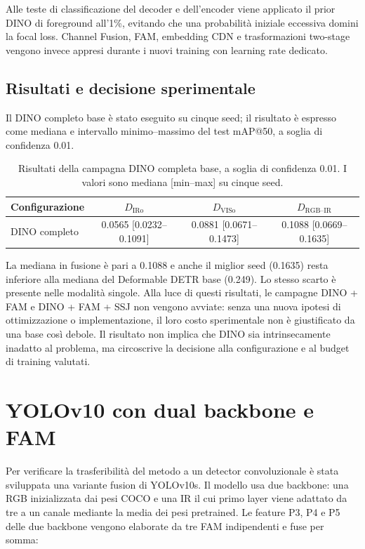 \documentclass[a4paper,11pt]{article}
\begin{document}
Alle teste di classificazione del decoder e dell'encoder viene applicato il prior DINO di foreground all'1\%, evitando che una probabilità iniziale eccessiva domini la focal loss. Channel Fusion, FAM, embedding CDN e trasformazioni two-stage vengono invece appresi durante i nuovi training con learning rate dedicato.

\subsection{Risultati e decisione sperimentale}

Il DINO completo base è stato eseguito su cinque seed; il risultato è espresso come mediana e intervallo minimo--massimo del test mAP@50, a soglia di confidenza 0.01.

\begin{table}[htbp]
\centering
\caption{Risultati della campagna DINO completa base, a soglia di confidenza 0.01. I valori sono mediana [min--max] su cinque seed.}
\label{tab:dino_status}
\begin{tabular}{lccc}
\toprule
Configurazione & $D_{\text{IRo}}$ & $D_{\text{VISo}}$ & $D_{\text{RGB--IR}}$ \\
\midrule
DINO completo & 0.0565 [0.0232--0.1091] & 0.0881 [0.0671--0.1473] & 0.1088 [0.0669--0.1635] \\
\bottomrule
\end{tabular}
\end{table}

La mediana in fusione è pari a 0.1088 e anche il miglior seed (0.1635) resta inferiore alla mediana del Deformable DETR base (0.249). Lo stesso scarto è presente nelle modalità singole. Alla luce di questi risultati, le campagne DINO + FAM e DINO + FAM + SSJ non vengono avviate: senza una nuova ipotesi di ottimizzazione o implementazione, il loro costo sperimentale non è giustificato da una base così debole. Il risultato non implica che DINO sia intrinsecamente inadatto al problema, ma circoscrive la decisione alla configurazione e al budget di training valutati.

\newpage

\section{YOLOv10 con dual backbone e FAM}

Per verificare la trasferibilità del metodo a un detector convoluzionale è stata sviluppata una variante fusion di YOLOv10s. Il modello usa due backbone: una RGB inizializzata dai pesi COCO e una IR il cui primo layer viene adattato da tre a un canale mediante la media dei pesi pretrained. Le feature P3, P4 e P5 delle due backbone vengono elaborate da tre FAM indipendenti e fuse per somma:
\end{document}
